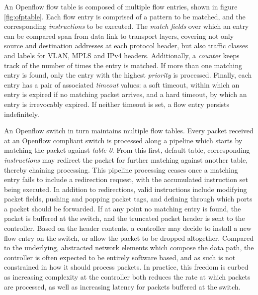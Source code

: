 An Openflow flow table is composed of multiple flow entries, shown in figure \ref{fig:ofptable}.
Each flow entry is comprised of a pattern to be matched, and the corresponding \emph{instructions} to be executed. 
The \emph{match fields} over which an entry can be compared span from data link to transport layers, covering not only source and destination addresses at each protocol header, but also traffic classes and labels for \ac{VLAN}, \ac{MPLS} and \ac{IPv4} headers.
Additionally, a \emph{counter} keeps track of the number of times the entry is matched.
If more than one matching entry is found, only the entry with the highest \emph{priority} is processed.
Finally, each entry has a pair of associated \emph{timeout} values: a soft timeout, within which an entry is expired if no matching packet arrives, and a hard timeout, by which an entry is irrevocably expired.
If neither timeout is set, a flow entry persists indefinitely.

An Openflow switch in turn maintains multiple flow tables.
Every packet received at an Openflow compliant switch is processed along a pipeline which starts by matching the packet against \emph{table 0}.
From this first, default table, corresponding \emph{instructions} may redirect the packet for further matching against another table, thereby chaining processing.
This pipeline processing ceases once a matching entry fails to include a redirection request, with the accumulated instruction set being executed.
In addition to redirections, valid instructions include modifying packet fields, pushing and popping packet tags, and defining through which ports a packet should be forwarded.
If at any point no matching entry is found, the packet is buffered at the switch, and the truncated packet header is sent to the controller.
Based on the header contents, a controller may decide to install a new flow entry on the switch, or allow the packet to be dropped altogether.
Compared to the underlying, abstracted network elements which compose the data path, the controller is often expected to be entirely software based, and as such is not constrained in how it should process packets.
In practice, this freedom is curbed as increasing complexity at the controller both reduces the rate at which packets are processed, as well as increasing latency for packets buffered at the switch.

